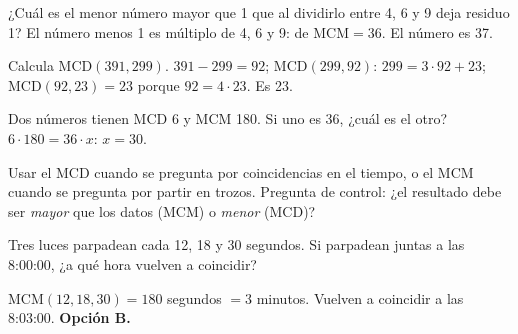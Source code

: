 \begin{ejemplo}
¿Cuál es el menor número mayor que 1 que al dividirlo entre 4, 6 y 9 deja residuo 1?
\solucion El número menos 1 es múltiplo de 4, 6 y 9: de $\text{MCM} = 36$. El número es 37.
\end{ejemplo}

\begin{ejemplo}[Euclides]
Calcula $\text{MCD}(391, 299)$.
\solucion $391 - 299 = 92$; $\text{MCD}(299, 92)$: $299 = 3 \cdot 92 + 23$; $\text{MCD}(92, 23) = 23$ porque $92 = 4
\cdot 23$. Es 23.
\end{ejemplo}

\begin{ejemplo}
Dos números tienen MCD 6 y MCM 180. Si uno es 36, ¿cuál es el otro?
\solucion $6 \cdot 180 = 36 \cdot x$: $x = 30$.
\end{ejemplo}

\begin{trampa}
Usar el MCD cuando se pregunta por coincidencias en el tiempo, o el MCM cuando se pregunta por partir en trozos. Pregunta
de control: ¿el resultado debe ser \emph{mayor} que los datos (MCM) o \emph{menor} (MCD)?
\end{trampa}

\begin{reto}
Tres luces parpadean cada 12, 18 y 30 segundos. Si parpadean juntas a las 8:00:00, ¿a qué hora vuelven a coincidir?
\end{reto}

\begin{retoresuelto}
$\text{MCM}(12, 18, 30) = 180$ segundos $= 3$ minutos. Vuelven a coincidir a las 8:03:00. \textbf{Opción B.}
\end{retoresuelto}

